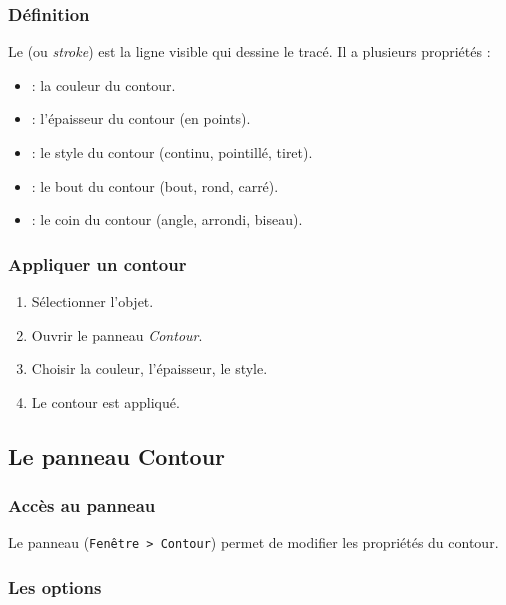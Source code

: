 \subsubsection{Définition}

Le  (ou \emph{stroke}) est la ligne visible qui dessine le tracé. Il a plusieurs propriétés :

\begin{itemize}
    \item {} : la couleur du contour.
    \item {} : l'épaisseur du contour (en points).
    \item {} : le style du contour (continu, pointillé, tiret).
    \item {} : le bout du contour (bout, rond, carré).
    \item {} : le coin du contour (angle, arrondi, biseau).
\end{itemize}

\subsubsection{Appliquer un contour}

\begin{enumerate}
    \item Sélectionner l'objet.
    \item Ouvrir le panneau \emph{Contour}.
    \item Choisir la couleur, l'épaisseur, le style.
    \item Le contour est appliqué.
\end{enumerate}

\subsection{Le panneau Contour}

\subsubsection{Accès au panneau}

Le panneau  (\texttt{Fenêtre > Contour}) permet de modifier les propriétés du contour.

\subsubsection{Les options}

